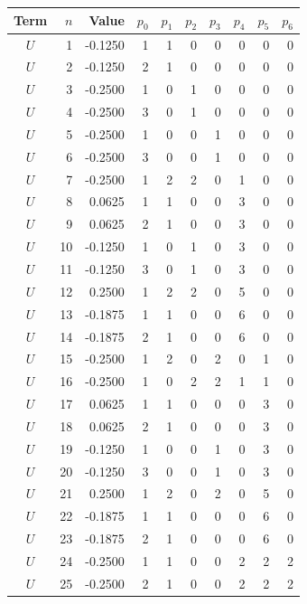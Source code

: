 \begin{tabular}{crrrrrrrrr}
    \hline
    \hline
        Term  & $n$ & Value & $p_0$ & $p_1$ & $p_2$ & $p_3$ & $p_4$ & $p_5$ & $p_6$ \\
    \hline
    $U $ & 1   & -0.1250 & 1 & 1 & 0 & 0 & 0 & 0 & 0 \\
    $U $ & 2   & -0.1250 & 2 & 1 & 0 & 0 & 0 & 0 & 0 \\
    $U $ & 3   & -0.2500 & 1 & 0 & 1 & 0 & 0 & 0 & 0 \\
    $U $ & 4   & -0.2500 & 3 & 0 & 1 & 0 & 0 & 0 & 0 \\
    $U $ & 5   & -0.2500 & 1 & 0 & 0 & 1 & 0 & 0 & 0 \\
    $U $ & 6   & -0.2500 & 3 & 0 & 0 & 1 & 0 & 0 & 0 \\
    $U $ & 7   & -0.2500 & 1 & 2 & 2 & 0 & 1 & 0 & 0 \\
    $U $ & 8   &  0.0625 & 1 & 1 & 0 & 0 & 3 & 0 & 0 \\
    $U $ & 9   &  0.0625 & 2 & 1 & 0 & 0 & 3 & 0 & 0 \\
    $U $ & 10  & -0.1250 & 1 & 0 & 1 & 0 & 3 & 0 & 0 \\
    $U $ & 11  & -0.1250 & 3 & 0 & 1 & 0 & 3 & 0 & 0 \\
    $U $ & 12  &  0.2500 & 1 & 2 & 2 & 0 & 5 & 0 & 0 \\
    $U $ & 13  & -0.1875 & 1 & 1 & 0 & 0 & 6 & 0 & 0 \\
    $U $ & 14  & -0.1875 & 2 & 1 & 0 & 0 & 6 & 0 & 0 \\
    $U $ & 15  & -0.2500 & 1 & 2 & 0 & 2 & 0 & 1 & 0 \\
    $U $ & 16  & -0.2500 & 1 & 0 & 2 & 2 & 1 & 1 & 0 \\
    $U $ & 17  &  0.0625 & 1 & 1 & 0 & 0 & 0 & 3 & 0 \\
    $U $ & 18  &  0.0625 & 2 & 1 & 0 & 0 & 0 & 3 & 0 \\
    $U $ & 19  & -0.1250 & 1 & 0 & 0 & 1 & 0 & 3 & 0 \\
    $U $ & 20  & -0.1250 & 3 & 0 & 0 & 1 & 0 & 3 & 0 \\
    $U $ & 21  &  0.2500 & 1 & 2 & 0 & 2 & 0 & 5 & 0 \\
    $U $ & 22  & -0.1875 & 1 & 1 & 0 & 0 & 0 & 6 & 0 \\
    $U $ & 23  & -0.1875 & 2 & 1 & 0 & 0 & 0 & 6 & 0 \\
    $U $ & 24  & -0.2500 & 1 & 1 & 0 & 0 & 2 & 2 & 2 \\
    $U $ & 25  & -0.2500 & 2 & 1 & 0 & 0 & 2 & 2 & 2 \\

\end{tabular}
